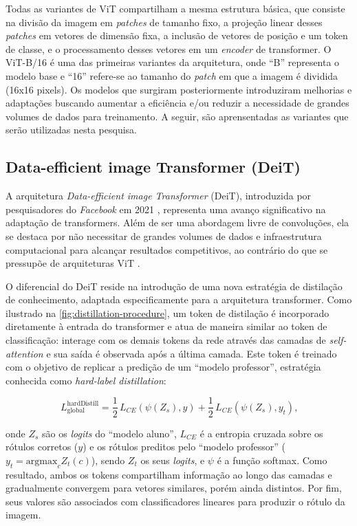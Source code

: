 Todas as variantes de ViT compartilham a mesma estrutura básica, que consiste na divisão da imagem em \textit{patches} de tamanho fixo, a projeção linear desses \textit{patches} em vetores de dimensão fixa, a inclusão de vetores de posição e um token de classe, e o processamento desses vetores em um \textit{encoder} de transformer. O ViT-B/16 \citep{Dosovitskiy2021} é uma das primeiras variantes da arquitetura, onde ``B'' representa o modelo base e ``16'' refere-se ao tamanho do \textit{patch} em que a imagem é dividida (16x16 pixels). Os modelos que surgiram posteriormente introduziram melhorias e adaptações buscando aumentar a eficiência e/ou reduzir a necessidade de grandes volumes de dados para treinamento. A seguir, são aprensentadas as variantes que serão utilizadas nesta pesquisa.

\subsection{Data-efficient image Transformer (DeiT)}

A arquitetura \textit{Data-efficient image Transformer} (DeiT), introduzida por pesquisadores do \textit{Facebook} em 2021 \citep{Touvron2021}, representa uma avanço significativo na adaptação de transformers. Além de ser uma abordagem livre de convoluções, ela se destaca por não necessitar de grandes volumes de dados e infraestrutura computacional para alcançar resultados competitivos, ao contrário do que se pressupõe de arquiteturas ViT \citep{Dosovitskiy2021}.

O diferencial do DeiT reside na introdução de uma nova estratégia de distilação de conhecimento, adaptada especificamente para a arquitetura transformer. Como ilustrado na \autoref{fig:distillation-procedure}, um token de distilação é incorporado diretamente à entrada do transformer e atua de maneira similar ao token de classificação: interage com os demais tokens da rede através das camadas de \textit{self-attention} e sua saída é observada após a última camada. Este token é treinado com o objetivo de replicar a predição de um ``modelo professor'', estratégia conhecida como \textit{hard-label distillation}:

\begin{equation}
    L_{\text{global}}^{\text{hardDistill}} = \frac{1}{2} \, L_{CE}\left( \psi(Z_s), y \right) + \frac{1}{2} \, L_{CE}\left( \psi(Z_s), y_t \right) \text{,}
\end{equation}

onde $Z_s$ são os \textit{logits} do ``modelo aluno'', $L_{CE}$ é a entropia cruzada sobre os rótulos corretos ($y$) e os rótulos preditos pelo ``modelo professor'' ($y_t = \text{argmax}_c Z_t(c)$), sendo $Z_t$ os seus \textit{logits}, e $\psi$ é a função softmax. Como resultado, ambos os tokens compartilham informação ao longo das camadas e gradualmente convergem para vetores similares, porém ainda distintos. Por fim, seus valores são associados com classificadores lineares para produzir o rótulo da imagem.


